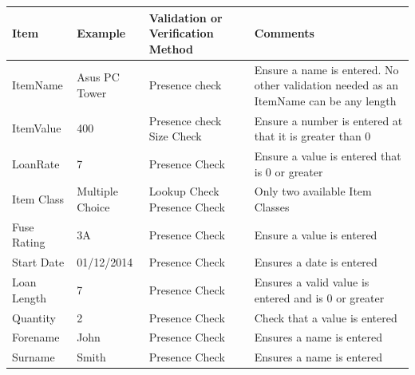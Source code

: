 \begin{center}
    \begin{longtable}{|p{3cm}|p{2cm}|p{4cm}|p{4cm}|}
        \hline
        \textbf{Item}    & \textbf{Example} & \textbf{Validation or Verification Method} & \textbf{Comments}\\ \hline
        ItemName         & Asus PC Tower    & Presence check                             & Ensure a name is entered. No other validation 
                                                                                           needed as an ItemName can be any length\\ 
                                                                                           \hline
        ItemValue        & 400              & Presence check \newline Size Check         & Ensure a number is entered at that it is 
                                                                                           greater than 0\\ \hline
        LoanRate         & 7                & Presence Check                             & Ensure a value is entered that is 0 or greater
                                                                                           \\ \hline
        Item Class       & Multiple Choice  & Lookup Check \newline Presence Check       & Only two available Item Classes\\ \hline
        Fuse Rating      & 3A               & Presence Check                             & Ensure a value is entered\\ \hline
        Start Date       & 01/12/2014       & Presence Check                             & Ensures a date is entered\\ \hline
        Loan Length      & 7                & Presence Check                             & Ensures a valid value is entered and is 0 or 
                                                                                           greater\\ \hline
        Quantity         & 2                & Presence Check                             & Check that a value is entered \\ \hline
        Forename         & John             & Presence Check                             & Ensures a name is entered\\ \hline
        Surname          & Smith            & Presence Check                             & Ensures a name is entered\\ \hline

\end{longtable}
\end{center}
